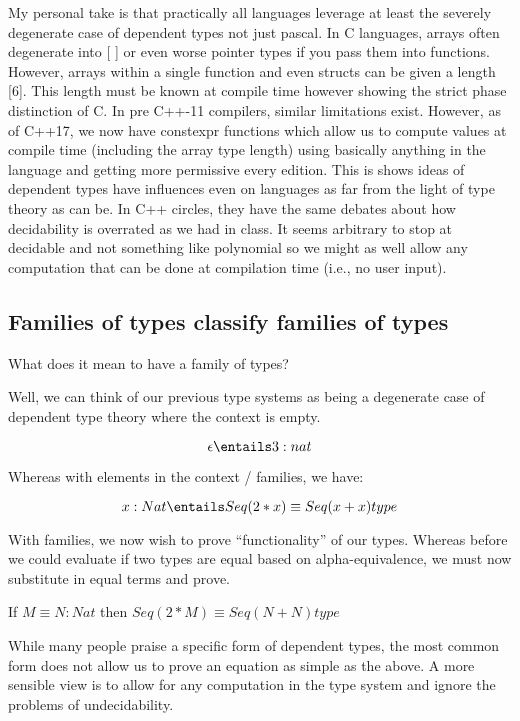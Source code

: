 \documentclass[11pt]{article}
\begin{document}
My personal take is that practically all languages leverage at least the severely degenerate case of dependent types not just pascal. In C languages, arrays often degenerate into [ ] or even worse pointer types if you pass them into functions. However, arrays within a single function and even structs can be given a length [6]. This length must be known at compile time however showing the strict phase distinction of C. In pre C++-11 compilers, similar limitations exist. However, as of C++17, we now have constexpr functions which allow us to compute values at compile time (including the array type length) using basically anything in the language and getting more permissive every edition. This is shows ideas of dependent types have influences even on languages as far from the light of type theory as can be. In C++ circles, they have the same debates about how decidability is overrated as we had in class. It seems arbitrary to stop at decidable and not something like polynomial so we might as well allow any computation that can be done at compilation time (i.e., no user input).

\subsection*{Families of types classify families of types}

What does it mean to have a family of types?

Well, we can think of our previous type systems as being a degenerate case of dependent type theory where the context is empty.

$$\epsilon \entails 3 : nat$$

Whereas with elements in the context / families, we have:

$$x : Nat \entails Seq(2 * x) \equiv Seq(x + x) type$$

With families, we now wish to prove ``functionality'' of our types. Whereas before we could evaluate if two types are equal based on alpha-equivalence, we must now substitute in equal terms and prove.

If $M \equiv N : Nat$ then $Seq(2 * M) \equiv Seq(N + N) type$

While many people praise a specific form of dependent types, the most common form does not allow us to prove an equation as simple as the above. A more sensible view is to allow for any computation in the type system and ignore the problems of undecidability.
\end{document}
